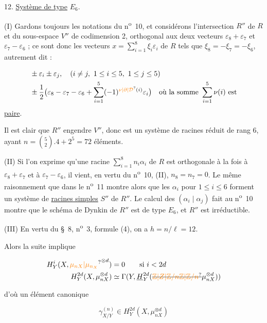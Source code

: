 12. \uline{Système de type} $E_6$.

(I) Gardons toujours les notations du n\textsuperscript{o}~10, et considérons l'intersection $R''$ de $R$ et du sous-espace $V''$ de codimension 2, orthogonal aux deux vecteurs $\varepsilon_8+\varepsilon_7$ et $\varepsilon_7-\varepsilon_6$ ; ce sont donc les vecteurs $x=\displaystyle\sum_{i=1}^{8}\xi_i\varepsilon_i$ de $R$ tels que $\xi_8=-\xi_7=-\xi_6$, autrement dit :

\[
\begin{aligned}
&\pm\varepsilon_i\pm\varepsilon_j,\quad(i\neq j,\ 1\leq i\leq5,\ 1\leq j\leq5)\\
&\pm\frac{1}{2}\bigl(\varepsilon_8-\varepsilon_7-\varepsilon_6+\sum_{i=1}^{5}(-1)^{\unsure{\nu|\partial|\mathcal D}(i)}\varepsilon_i\bigr)
\quad\text{où la somme }\sum_{i=1}^{5}\nu(i)\text{ est}
\end{aligned}
\]
\uline{paire}.

Il est clair que $R''$ engendre $V''$, donc est un système de racines réduit de rang 6, ayant $n=\binom{5}{2}.4+2^5=72$ éléments.

(II) Si l'on exprime qu'une racine $\displaystyle\sum_{i=1}^{8}n_i\alpha_i$ de $R$ est orthogonale à la fois à $\varepsilon_8+\varepsilon_7$ et à $\varepsilon_7-\varepsilon_6$, il vient, en vertu du n\textsuperscript{o}~10, (II), $n_8=n_7=0$. Le même raisonnement que dans le n\textsuperscript{o}~11 montre alors que les $\alpha_i$ pour $1\leq i\leq6$ forment un système de \uline{racines simples} $S''$ de $R''$. Le calcul des $(\alpha_i\mid\alpha_j)$ fait au n\textsuperscript{o}~10 montre que le schéma de Dynkin de $R''$ est de type $E_6$, et $R''$ est irréductible.

(III) En vertu du \S~8, n\textsuperscript{o}~3, formule (4), on a $h=n/\ell=12$.

Alors la suite  implique

\[
\begin{aligned}
H^i_Y(X,\unsure{\mu_{nX}|\mu_{n_X}}^{\otimes d})&=0\qquad\text{si }i<2d\\
H^{2d}_Y(X,\mu_{nX}^{\otimes d})&\simeq\Gamma(Y,\underline H^{2d}_Y(\deleted{\unsure{\mathbb Z|Z|\mathbb Z/n\mathbb Z|\mathbb Z/n}}\mu_{nX}^{\otimes d}))
\end{aligned}
\]

d'où un  élément canonique

\[
\gamma^{(n)}_{X/Y}\in H^{2d}_Y(X,\mu_{nX}^{\otimes d})
\]

